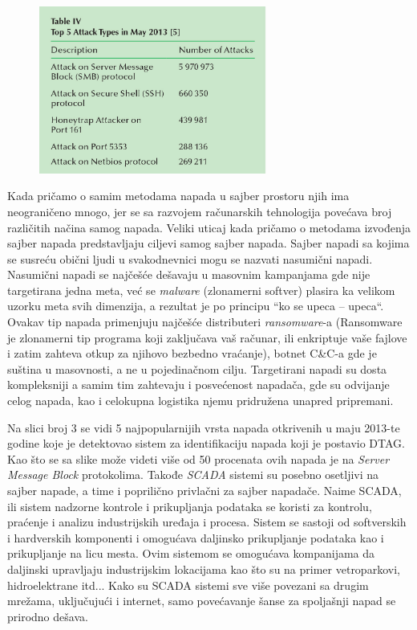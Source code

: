 \documentclass[a4paper]{article}
\begin{document}
{ \begin{figure}[h!]
  \centering
  \begin{center}
  \includegraphics[width=75mm]{slika2.jpg}
  \end{center}
  \caption{}
  \label{fig:vr1}
\end{figure}


Kada pričamo o samim metodama napada u sajber prostoru njih ima neograničeno mnogo, jer se sa razvojem računarskih tehnologija povećava broj različitih načina samog napada. Veliki uticaj kada pričamo o metodama izvođenja sajber napada predstavljaju ciljevi samog sajber napada. Sajber napadi sa kojima se susreću obični ljudi u svakodnevnici mogu se nazvati nasumični napadi. Nasumični napadi se najčešće dešavaju u masovnim kampanjama gde nije targetirana jedna meta, već se \emph{malware} (zlonamerni softver) plasira ka velikom uzorku meta svih dimenzija, a rezultat je po principu “ko se upeca – upeca“. Ovakav tip napada primenjuju najčešće distributeri \emph{ransomware}-a (Ransomware je zlonamerni tip programa koji zaključava vaš računar, ili enkriptuje vaše fajlove i zatim zahteva otkup za njihovo bezbedno vraćanje), botnet C&C-a gde je suština u masovnosti, a ne u pojedinačnom cilju.
Targetirani napadi su dosta kompleksniji a samim tim zahtevaju i posvećenost napadača, gde su odvijanje celog napada, kao i celokupna logistika njemu pridružena unapred pripremani.

Na slici broj 3 se vidi 5 najpopularnijih vrsta napada otkrivenih u maju 2013-te godine koje je detektovao sistem za identifikaciju napada koji je postavio DTAG. Kao što se sa slike može videti više od 50 procenata ovih napada je na \emph{Server Message Block} protokolima.
Takođe \emph{SCADA} sistemi su posebno osetljivi na sajber napade, a time i poprilično privlačni za sajber napadače. Naime SCADA, ili sistem nadzorne kontrole i prikupljanja podataka se koristi za kontrolu, praćenje i analizu industrijskih uređaja i procesa.
Sistem se sastoji od softverskih i hardverskih komponenti i omogućava daljinsko prikupljanje podataka kao i prikupljanje na licu mesta. Ovim sistemom se omogućava kompanijama da daljinski upravljaju industrijskim lokacijama kao što su na primer vetroparkovi, hidroelektrane itd...
Kako su SCADA sistemi sve više povezani sa drugim mrežama, uključujući i internet, samo povećavanje šanse za spoljašnji napad se prirodno dešava.



}
\end{document}
